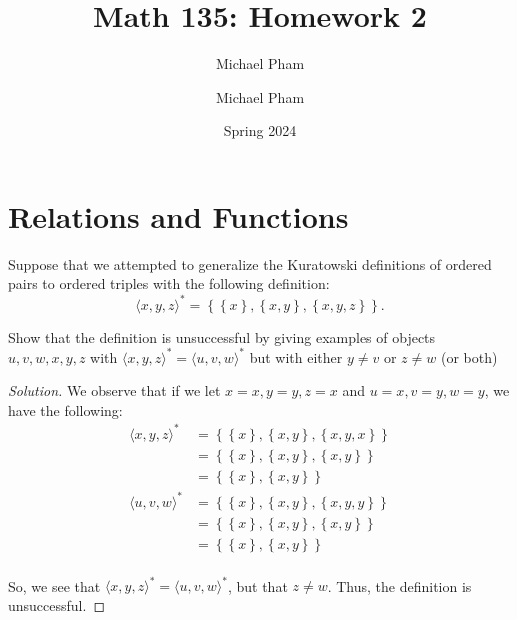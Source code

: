 \documentclass{article}
\title{#1}
\author{Michael Pham}
\date{#2}
\newenvironment{solution}{\begin{proof}[Solution]}{\end{proof}}
\newcommand{\brc}[1]{ \left\{  {#1} \right\}}
\newcommand{\ang}[1]{\langle {#1} \rangle}
\newcommand{\mytitle}[2]{%
	\title{#1}
	\author{Michael Pham}
	\date{#2}
	\maketitle
	\newpage
	\listoftheorems
	\newpage
}
\begin{document}
	\mytitle{Math 135: Homework 2}{Spring 2024}
	
	\setcounter{section}{2}
	
	\section{Relations and Functions}
	\setcounter{subsection}{1}
	\begin{hw}
		Suppose that we attempted to generalize the Kuratowski definitions of ordered pairs to ordered triples with the following definition:
		\begin{equation*}
			\ang{x,y,z}^{*} = \brc{ \brc{x}, \brc{x,y}, \brc{x,y,z}}.
		\end{equation*}
		
		Show that the definition is unsuccessful by giving examples of objects $u,v,w,x,y,z$ with $\ang{x,y,z}^{*} = \ang{u,v,w}^{*}$ but with either $y \neq v$ or $z \neq w$ (or both)
	\end{hw}
	\begin{solution}
		We observe that if we let $x = x, y = y, z = x$ and $u = x, v = y, w = y$, we have the following:
		\begin{align*}
			\ang{x,y,z}^{*} &= \brc{ \brc{x}, \brc{x,y}, \brc{x,y,x}} \\
			&= \brc{ \brc{x}, \brc{x,y}, \brc{x,y}} \\
			&= \brc{ \brc{x}, \brc{x,y}} \\
			\ang{u,v,w}^{*} &= \brc{ \brc{x}, \brc{x,y}, \brc{x,y,y}} \\
			&= \brc{ \brc{x}, \brc{x,y}, \brc{x,y}} \\
			&= \brc{ \brc{x}, \brc{x,y}} \\
		\end{align*}
		
		So, we see that $\ang{x,y,z}^{*} = \ang{u,v,w}^{*}$, but that $z \neq w$. Thus, the definition is unsuccessful.
	\end{solution}
	
\end{document}
